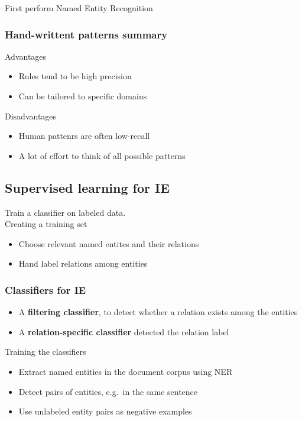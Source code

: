 First perform Named Entity Recognition

\subsubsection{Hand-writtent patterns summary}
Advantages
\begin{itemize}
\item Rules tend to be high precision
\item Can be tailored to specific domains
\end{itemize}
Disadvantages
\begin{itemize}
\item Human pattenrs are often low-recall
\item A lot of effort to think of all possible patterns
\end{itemize}

\subsection{Supervised learning for IE}
Train a classifier on labeled data. \\
Creating a training set
\begin{itemize}
\item Choose relevant named entites and their relations
\item Hand label relations among entities
\end{itemize}

\subsubsection{Classifiers for IE}
\begin{itemize}
\item A \textbf{filtering classifier}, to detect whether a relation
  exists among the entities
\item A \textbf{relation-specific classifier} detected the relation
  label
\end{itemize}

Training the classifiers
\begin{itemize}
\item Extract named entities in the document corpus using NER
\item Detect pairs of entities, e.g.\, in the same sentence
\item Use unlabeled entity pairs as negative examples
\end{itemize}

